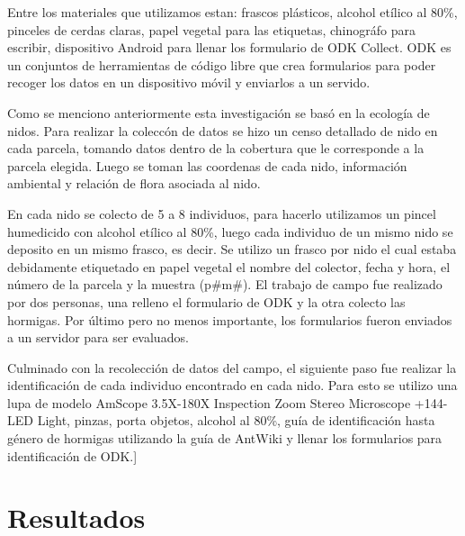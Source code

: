 \documentclass[11pt,]{article}
\begin{document}
Entre los materiales que utilizamos estan: frascos plásticos, alcohol
etílico al 80\%, pinceles de cerdas claras, papel vegetal para las
etiquetas, chinográfo para escribir, dispositivo Android para llenar los
formulario de ODK Collect. ODK es un conjuntos de herramientas de código
libre que crea formularios para poder recoger los datos en un
dispositivo móvil y enviarlos a un servido.

Como se menciono anteriormente esta investigación se basó en la ecología
de nidos. Para realizar la coleccón de datos se hizo un censo detallado
de nido en cada parcela, tomando datos dentro de la cobertura que le
corresponde a la parcela elegida. Luego se toman las coordenas de cada
nido, información ambiental y relación de flora asociada al nido.

En cada nido se colecto de 5 a 8 individuos, para hacerlo utilizamos un
pincel humedicido con alcohol etílico al 80\%, luego cada individuo de
un mismo nido se deposito en un mismo frasco, es decir. Se utilizo un
frasco por nido el cual estaba debidamente etiquetado en papel vegetal
el nombre del colector, fecha y hora, el número de la parcela y la
muestra (p\#m\#). El trabajo de campo fue realizado por dos personas,
una relleno el formulario de ODK y la otra colecto las hormigas. Por
último pero no menos importante, los formularios fueron enviados a un
servidor para ser evaluados.

Culminado con la recolección de datos del campo, el siguiente paso fue
realizar la identificación de cada individuo encontrado en cada nido.
Para esto se utilizo una lupa de modelo AmScope 3.5X-180X Inspection
Zoom Stereo Microscope +144-LED Light, pinzas, porta objetos, alcohol al
80\%, guía de identificación hasta género de hormigas utilizando la guía
de AntWiki y llenar los formularios para identificación de ODK.{]}

\section{Resultados}\label{resultados}
\end{document}
